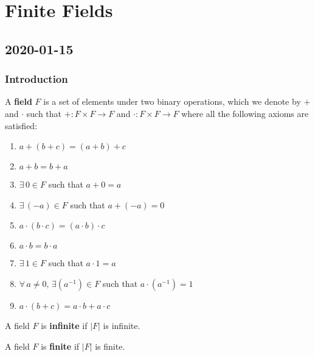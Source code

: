 \chapter{Finite Fields}
\section{2020-01-15}
\subsection{Introduction}
\begin{defbox}
    \begin{definition}
    A \textbf{field} $ F $ is a set of elements under two binary operations,
    which we denote by $ + $ and $ \cdot $ such that
    $ +:F\times F\rightarrow F $ and $ \cdot:F\times F\rightarrow F $
    where all the following axioms are satisfied:
    \begin{enumerate}[V1]
        \item $ a+(b+c)=(a+b)+c $
        \item $ a+b=b+a $
        \item $ \exists\, 0\in F $ such that $ a+0=a $
        \item $ \exists\, (-a)\in F $ such that $ a+(-a)=0 $
        \item $ a\cdot (b\cdot c)=(a\cdot b)\cdot c $
        \item $ a\cdot b=b\cdot a $
        \item $ \exists\, 1\in F $ such that $ a\cdot 1=a $
        \item $ \forall\,a\neq 0,\,\exists (a^{-1})\in F $ such that
        $ a\cdot (a^{-1})=1 $
        \item $ a\cdot (b+c)=a\cdot b+a\cdot c $
    \end{enumerate}
\end{definition} \end{defbox}

\begin{defbox}
    \begin{definition}
    A field $ F $ is \textbf{infinite} if $ |F| $ is infinite.
\end{definition} \end{defbox}

\begin{defbox}
    \begin{definition}
    A field $ F $ is \textbf{finite} if $ |F| $ is finite.
\end{definition} \end{defbox}

